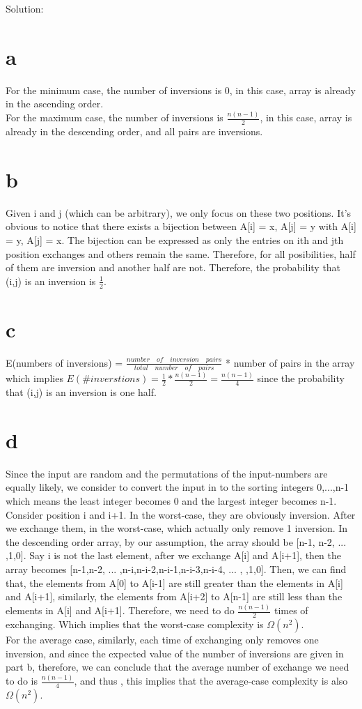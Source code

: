 \documentclass[12pt]{article}
\begin{document}
	Solution:
	\begin{itemize}
		\part{a}
		For the minimum case, the number of inversions is 0, in this case, array is already in the ascending order.\\
		For the maximum case, the number of inversions is $\frac{n(n-1)}{2}$, in this case, array is already in the descending order, and all pairs are inversions.
		\part{b}
		Given i and j (which can be arbitrary), we only focus on these two positions. It's obvious to notice that there exists a bijection between A[i] = x, A[j] = y with A[i] = y, A[j] = x. The bijection can be expressed as only the entries on ith and jth position exchanges and others remain the same. Therefore, for all posibilities, half of them are inversion and another half are not. Therefore, the probability that (i,j) is an inversion is $\frac{1}{2}$.
		\part{c}
		E(numbers of inversions) = $\frac{number\quad of\quad inversion\quad pairs}{total\quad number\quad of\quad pairs}$ * number of pairs in the array
		which implies $E(\# inverstions) = \frac{1}{2}*\frac{n(n-1)}{2}=\frac{n(n-1)}{4}$ since the probability that (i,j) is an inversion is one half.
		\part{d}
		Since the input are random and the permutations of the input-numbers are equally likely, we consider to convert the input in to the sorting integers 0,...,n-1 which means the least integer becomes 0 and the largest integer becomes n-1. Consider position i and i+1. In the worst-case, they are obviously inversion. After we exchange them, in the worst-case, which actually only remove 1 inversion. In the descending order array, by our assumption, the array should be [n-1, n-2, ... ,1,0]. Say i is not the last element, after we exchange A[i] and A[i+1], then the array becomes [n-1,n-2, ... ,n-i,n-i-2,n-i-1,n-i-3,n-i-4, ... , ,1,0]. Then, we can find that, the elements from A[0] to A[i-1] are still greater than the elements in A[i] and A[i+1], similarly, the elements from A[i+2] to A[n-1] are still less than the elements in A[i] and A[i+1]. Therefore, we need to do $\frac{n(n-1)}{2}$ times of exchanging. Which implies that the worst-case complexity is $\Omega(n^2)$.\\
		For the average case, similarly, each time of exchanging only removes one inversion, and since the expected value of the number of inversions are given in part b, therefore, we can conclude that the average number of exchange we need to do is $\frac{n(n-1)}{4}$, and thus , this implies that the average-case complexity is also $\Omega(n^2)$.
	\end{itemize}
	
\end{document}
